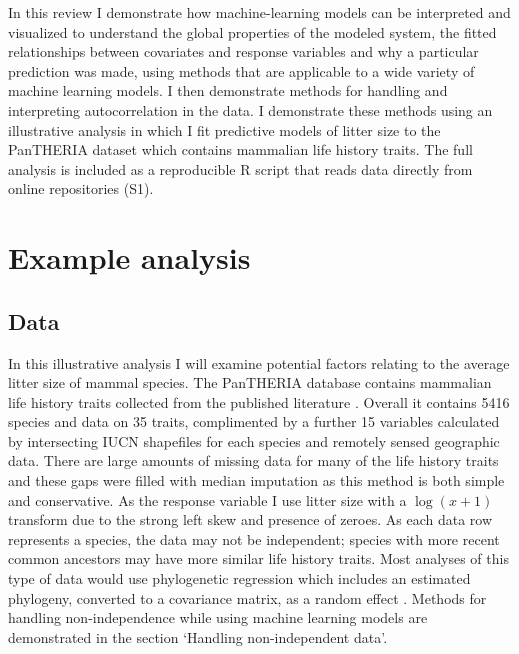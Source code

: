 \documentclass[12pt,]{article}
\begin{document}
In this review I demonstrate how machine-learning models can be interpreted and visualized to understand the global properties of the modeled system, the fitted relationships between covariates and response variables and why a particular prediction was made, using methods that are applicable to a wide variety of machine learning models.
I then demonstrate methods for handling and interpreting autocorrelation in the data.
I demonstrate these methods using an illustrative analysis in which I fit predictive models of litter size to the PanTHERIA dataset \citep{jones2009pantheria} which contains mammalian life history traits.
The full analysis is included as a reproducible R \citep{R} script that reads data directly from online repositories (S1).

\section{Example analysis}\label{example-analysis}

\subsection{Data}\label{data}

In this illustrative analysis I will examine potential factors relating to the average litter size of mammal species.
The PanTHERIA database contains mammalian life history traits collected from the published literature \citep{jones2009pantheria}.
Overall it contains 5416 species and data on 35 traits, complimented by a further 15 variables calculated by intersecting IUCN shapefiles for each species and remotely sensed geographic data.
There are large amounts of missing data for many of the life history traits and these gaps were filled with median imputation as this method is both simple and conservative.
As the response variable I use litter size with a \(\log(x+1)\) transform due to the strong left skew and presence of zeroes.
As each data row represents a species, the data may not be independent; species with more recent common ancestors may have more similar life history traits.
Most analyses of this type of data \citep{felsenstein1985phylogenies, ives2006statistics, gay2014parasite, pellissier2012shifts, ferguson2014colony} would use phylogenetic regression which includes an estimated phylogeny, converted to a covariance matrix, as a random effect \citep{magnusson2017glmmtmb, caper}.
Methods for handling non-independence while using machine learning models are demonstrated in the section `Handling non-independent data'.
\end{document}
